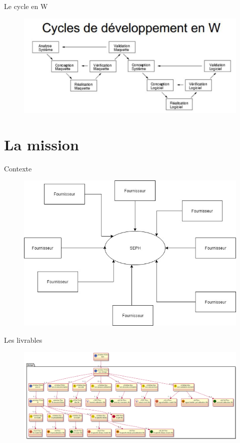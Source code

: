 \documentclass{bredelebeamer}
\begin{document}
\begin{frame}{Le cycle en W}
	\begin{figure}
		\centering
		\includegraphics[scale=0.35]{images/cycleW.png}
	\end{figure}
\end{frame}

\section{La mission}

\begin{frame}{Contexte}
	\begin{figure}
		\centering
		\includegraphics[scale=0.35]{images/schemasEntrant.jpg}
	\end{figure}
\end{frame}

\begin{frame}{Les livrables}
	\begin{figure}
		\centering
		\includegraphics[scale=0.3]{images/livrables.png}
	\end{figure}
\end{frame}
\end{document}
